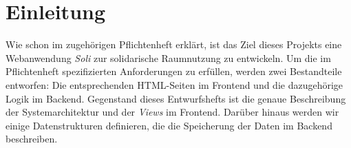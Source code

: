 
\chapter{Einleitung}
\label{ch:preface}


Wie schon im zugehörigen Pflichtenheft erklärt, ist das Ziel dieses Projekts eine Webanwendung \textit{Soli} zur solidarische Raumnutzung zu entwickeln.
Um die im Pflichtenheft spezifizierten Anforderungen zu erfüllen, werden zwei Bestandteile entworfen: Die entsprechenden HTML-Seiten im Frontend und die dazugehörige Logik im Backend.
Gegenstand dieses Entwurfshefts ist die genaue Beschreibung der Systemarchitektur und der \textit{Views} im Frontend.
Darüber hinaus werden wir einige Datenstrukturen definieren, die die Speicherung der Daten im Backend beschreiben.